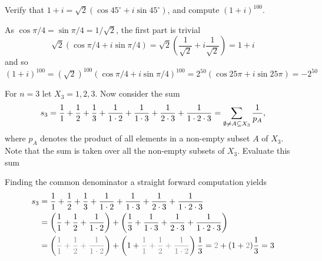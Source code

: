 \documentclass[a4paper, english, 12pt]{article} %
\begin{document}
\begin{subproblem}
  Verify that $1 + i = \sqrt{2}(\cos 45^\circ + i \sin 45^\circ)$, and compute $(1+i)^{100}$.
\end{subproblem}

\begin{answer}
  As $\cos \pi/4 = \sin \pi/4 = 1/\sqrt{2}$, the first part is trivial
  \begin{equation*}
    \sqrt{2}( \cos \pi/4 + i \sin \pi/4) = \sqrt{2}\left( \frac{1}{\sqrt{2}} + i \frac{1}{\sqrt{2}} \right) = 1 + i
  \end{equation*}
  and so $(1+i)^{100} = (\sqrt{2})^{100}(\cos \pi/4 + i\sin \pi/4)^{100} =
  2^{50}(\cos 25 \pi + i \sin 25 \pi) = -2^{50}$
\end{answer}

\begin{problem}[16]
  \begin{subproblem}
    \label{subprob:16a}
    For $n=3$ let $X_3 = {1,2,3}$. Now consider the sum
    \begin{equation*}
      s_3 = \frac{1}{1} + \frac{1}{2} + \frac{1}{3}
      + \frac{1}{1\cdot 2} + \frac{1}{ 1 \cdot 3} + \frac{1}{2 \cdot 3} + \frac{1}{1 \cdot 2 \cdot 3} \\
       = \sum_{\emptyset \neq A \subseteq X_3} \frac{1}{p_A},
     \end{equation*}
     where $p_A$ denotes the product of all elements in a non-empty subset $A$
     of $X_3$. Note that the sum is taken over all the non-empty subsets of
     $X_3$. Evaluate this sum
  \end{subproblem}
\end{problem}

\begin{answer}
  Finding the common denominator a straight forward computation yields
  \begin{align*}
      s_3 & = \frac{1}{1} + \frac{1}{2} + \frac{1}{3}
    + \frac{1}{1\cdot 2} + \frac{1}{ 1 \cdot 3} + \frac{1}{2 \cdot 3} + \frac{1}{1 \cdot 2 \cdot 3} \\
          & = \left(   \frac{1}{1} + \frac{1}{2} + \frac{1}{1 \cdot 2} \right)
            + \left(  \frac{1}{3} + \frac{1}{1\cdot 3} + \frac{1}{2 \cdot 3} + \frac{1}{1 \cdot 2 \cdot 3} \right)\\
          & = \left(   \textcolor{gray}{\frac{1}{1} + \frac{1}{2} + \frac{1}{1 \cdot 2}} \right)
            + \left( 1 + \textcolor{gray}{\frac{1}{1} + \frac{1}{2} + \frac{1}{1 \cdot 2}} \right)\frac{1}{3}
            = \textcolor{gray}{2} + (1 + \textcolor{gray}{2})\frac{1}{3} = 3
  \end{align*}
\end{answer}
\end{document}
